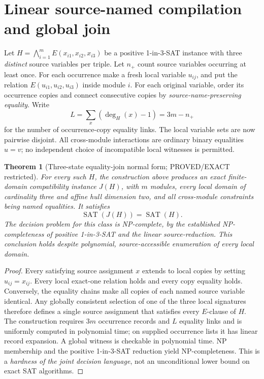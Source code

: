 \documentclass[11pt]{article}
\newtheorem{theorem}{Theorem}
\newcommand{\SAT}{\operatorname{SAT}}
\begin{document}
\section{Linear source-named compilation and global join}
Let \(H=\bigwedge_{i=1}^m E(x_{i1},x_{i2},x_{i3})\) be a positive 1-in-3-SAT instance with three \emph{distinct} source variables per triple. Let \(n_+\) count source variables occurring at least once. For each occurrence make a fresh local variable \(u_{ij}\), and put the relation \(E(u_{i1},u_{i2},u_{i3})\) inside module \(i\). For each original variable, order its occurrence copies and connect consecutive copies by \emph{source-name-preserving equality}. Write
\[
L=\sum_{x}(\deg_H(x)-1)=3m-n_+
\]
for the number of occurrence-copy equality links. The local variable sets are now pairwise disjoint. All cross-module interactions are ordinary binary equalities \(u=v\); no independent choice of incompatible local witnesses is permitted.

\begin{theorem}[Three-state equality-join normal form; PROVED/EXACT restricted]
For every such \(H\), the construction above produces an exact finite-domain compatibility instance \(J(H)\), with \(m\) modules, every local domain of cardinality three and affine hull dimension two, and all cross-module constraints being named equalities. It satisfies
\[
\boxed{\SAT(J(H))=\SAT(H).}
\]
The decision problem for this class is NP-complete, by the established NP-completeness of positive 1-in-3-SAT and the linear source-reduction. This conclusion holds despite polynomial, source-accessible enumeration of \emph{every local} domain.
\end{theorem}
\begin{proof}
Every satisfying source assignment \(x\) extends to local copies by setting \(u_{ij}=x_{ij}\). Every local exact-one relation holds and every copy equality holds. Conversely, the equality chains make all copies of each named source variable identical. Any globally consistent selection of one of the three local signatures therefore defines a single source assignment that satisfies every \(E\)-clause of \(H\). The construction requires \(3m\) occurrence records and \(L\) equality links and is uniformly computed in polynomial time; on supplied occurrence lists it has linear record expansion. A global witness is checkable in polynomial time. NP membership and the positive 1-in-3-SAT reduction yield NP-completeness. This is a \emph{hardness of the joint decision language}, not an unconditional lower bound on exact SAT algorithms.
\end{proof}
\end{document}
